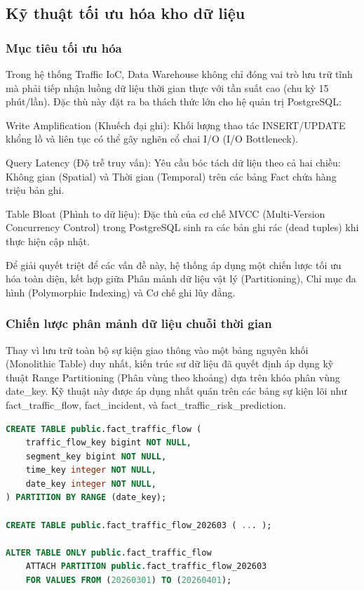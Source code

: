 \subsection{Kỹ thuật tối ưu hóa kho dữ liệu}
\subsubsection{Mục tiêu tối ưu hóa}
Trong hệ thống Traffic IoC, Data Warehouse không chỉ đóng vai trò lưu trữ tĩnh mà phải tiếp nhận luồng dữ liệu thời gian thực với tần suất cao (chu kỳ 15 phút/lần). Đặc thù này đặt ra ba thách thức lớn cho hệ quản trị PostgreSQL:


Write Amplification (Khuếch đại ghi): Khối lượng thao tác INSERT/UPDATE khổng lồ và liên tục có thể gây nghẽn cổ chai I/O (I/O Bottleneck).


Query Latency (Độ trễ truy vấn): Yêu cầu bóc tách dữ liệu theo cả hai chiều: Không gian (Spatial) và Thời gian (Temporal) trên các bảng Fact chứa hàng triệu bản ghi.


Table Bloat (Phình to dữ liệu): Đặc thù của cơ chế MVCC (Multi-Version Concurrency Control) trong PostgreSQL sinh ra các bản ghi rác (dead tuples) khi thực hiện cập nhật.


Để giải quyết triệt để các vấn đề này, hệ thống áp dụng một chiến lược tối ưu hóa toàn diện, kết hợp giữa Phân mảnh dữ liệu vật lý (Partitioning), Chỉ mục đa hình (Polymorphic Indexing) và Cơ chế ghi lũy đẳng.


\subsubsection{Chiến lược phân mảnh dữ liệu chuỗi thời gian}
Thay vì lưu trữ toàn bộ sự kiện giao thông vào một bảng nguyên khối (Monolithic Table) duy nhất, kiến trúc sư dữ liệu đã quyết định áp dụng kỹ thuật Range Partitioning (Phân vùng theo khoảng) dựa trên khóa phân vùng date\_key. Kỹ thuật này được áp dụng nhất quán trên các bảng sự kiện lõi như fact\_traffic\_flow, fact\_incident, và fact\_traffic\_risk\_prediction.


\begin{lstlisting}[language=SQL]
CREATE TABLE public.fact_traffic_flow (
    traffic_flow_key bigint NOT NULL,
    segment_key bigint NOT NULL,
    time_key integer NOT NULL,
    date_key integer NOT NULL,
) PARTITION BY RANGE (date_key);

CREATE TABLE public.fact_traffic_flow_202603 ( ... );

ALTER TABLE ONLY public.fact_traffic_flow
    ATTACH PARTITION public.fact_traffic_flow_202603
    FOR VALUES FROM (20260301) TO (20260401);
\end{lstlisting}

